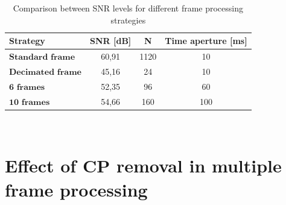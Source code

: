     
\begin{table}[H]
    \centering 
    \begin{tabular}{|p{9em} c c c |}
    \hline
    \rowcolor{bluepoli!40} %
     \textbf{Strategy} & \textbf{SNR [dB]} & \textbf{N} & \textbf{Time aperture [ms]} \T\B \\
    \hline \hline
    $\textbf{Standard frame}$ & 60,91 & 1120 & 10 \T\B \\
    $\textbf{Decimated frame}$ & 45,16 & 24 & 10 \T\B\\
    $\textbf{6 frames}$ & 52,35 & 96 & 60  \T\B\\
    $\textbf{10 frames}$ & 54,66 & 160 & 100  \T\B\\

    \hline
    \end{tabular}
    \\[10pt]
    \caption{Comparison between SNR levels for different frame processing strategies}
    \label{table:TDDstratcomparison}
\end{table}


\section{Effect of CP removal in multiple frame processing}
